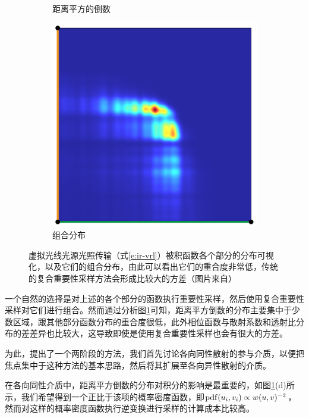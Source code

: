 \begin{figure}
\begin{fullwidth}
\begin{subfigure}[b]{0.19\thewidth}
		\caption{距离平方的倒数}
	\end{subfigure}
	\begin{subfigure}[b]{0.19\thewidth}
		\includegraphics[width=1.0\textwidth]{figures/ir/vrl-all}
		\caption{组合分布}
	\end{subfigure}
	\caption{虚拟光线光源光照传输（式\ref{e:ir-vrl}）被积函数各个部分的分布可视化，以及它们的组合分布，由此可以看出它们的重合度非常低，传统的复合重要性采样方法会形成比较大的方差（图片来自\cite{a:VirtualRayLightsforRenderingSceneswithParticipatingMedia}）}
	\label{f:ir-vrl-all}
\end{fullwidth}
\end{figure}

一个自然的选择是对上述的各个部分的函数执行重要性采样，然后使用复合重要性采样对它们进行组合。然而通过分析图\ref{f:ir-vrl-all}可知，距离平方倒数的分布主要集中于少数区域，跟其他部分函数分布的重合度很低，此外相位函数与散射系数和透射比分布的差差异也比较大，这导致即使是使用复合重要性采样也会有很大的方差。

为此，\cite{a:VirtualRayLightsforRenderingSceneswithParticipatingMedia}提出了一个两阶段的方法，我们首先讨论各向同性散射的参与介质，以便把焦点集中于这种方法的基本思路，然后将其扩展至各向异性散射的介质。

在各向同性介质中，距离平方倒数的分布对积分的影响是最重要的，如图\ref{f:ir-vrl-all}(d)所示，我们希望得到一个正比于该项的概率密度函数，即${\rm pdf}(u_i,v_i)\propto w(u,v)^{-2}$，然而对这样的概率密度函数执行逆变换进行采样的计算成本比较高。

